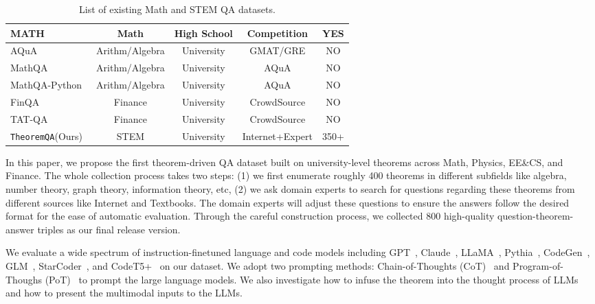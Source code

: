 \documentclass[11pt]{article}
\newcommand{\dataset}{\texttt{TheoremQA}\xspace}
\begin{document}
\begin{table*}[!t]
\begin{tabular}{lcccc}
        MATH~\cite{hendrycks2measuring}                & Math                    & High School          &  Competition     &   YES     \\
    \midrule
        AQuA~\cite{ling2017program}                    & Arithm/Algebra          & University           &  GMAT/GRE        &   NO       \\
        MathQA~\cite{amini2019mathqa}                  & Arithm/Algebra          & University           &  AQuA            &   NO       \\
        MathQA-Python~\cite{austin2021program}         & Arithm/Algebra          & University           &  AQuA            &   NO       \\
        FinQA~\cite{chen2021finqa}                     & Finance                 & University           &  CrowdSource     &   NO       \\
        TAT-QA~\cite{zhu2021tat}                       & Finance                 & University           &  CrowdSource     &   NO       \\
    \midrule
        \dataset  (Ours)                               & STEM                    & University           &  Internet+Expert &   350+      \\
    \bottomrule
    \end{tabular}
    \caption{List of existing Math and STEM QA datasets.}
    \label{tab:math_dataset}
\end{table*}

In this paper, we propose the first theorem-driven QA dataset built on university-level theorems across Math, Physics, EE\&CS, and Finance. The whole collection process takes two steps: (1) we first enumerate roughly 400 theorems in different subfields like algebra, number theory, graph theory, information theory, etc, (2) we ask domain experts to search for questions regarding these theorems from different sources like Internet and Textbooks. The domain experts will adjust these questions to ensure the answers follow the desired format for the ease of automatic evaluation. Through the careful construction process, we collected 800 high-quality question-theorem-answer triples as our final release version. 

We evaluate a wide spectrum of instruction-finetuned language and code models including GPT~\cite{brown2020language}, Claude~\cite{bai2022constitutional}, LLaMA~\cite{touvron2023llama}, Pythia~\cite{biderman2023pythia}, CodeGen~\cite{nijkamp2022codegen}, GLM~\cite{zeng2022glm}, StarCoder~\cite{li2023starcoder}, and CodeT5+~\cite{wang2023codet5+} on our dataset. We adopt two prompting methods: Chain-of-Thoughts (CoT)~\cite{weichain} and Program-of-Thoughs (PoT)~\cite{chen2022program} to prompt the large language models. We also investigate how to infuse the theorem into the thought process of LLMs and how to present the multimodal inputs to the LLMs. 
\end{document}
